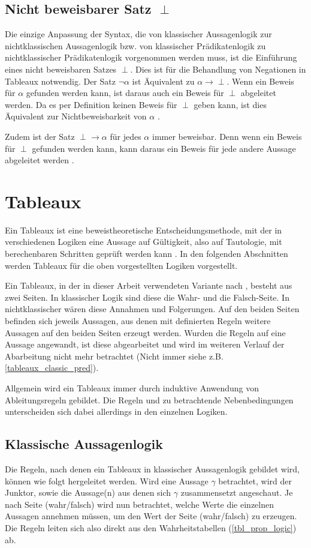 \subsection{\label{intu_non_proof_sentence}Nicht beweisbarer Satz $\perp$}
Die einzige Anpassung der Syntax, die von klassischer Aussagenlogik zur nichtklassischen Aussagenlogik bzw. von klassischer Prädikatenlogik zu nichtklassischer Prädikatenlogik vorgenommen werden muss, ist die Einführung eines nicht beweisbaren Satzes $\perp$. Dies ist für die Behandlung von Negationen in Tableaux notwendig. Der Satz $\neg\alpha$ ist Äquivalent zu $\alpha\rightarrow\perp$. Wenn ein Beweis für $\alpha$ gefunden werden kann, ist daraus auch ein Beweis für $\perp$ abgeleitet werden. Da es per Definition keinen Beweis für $\perp$ geben kann, ist dies Äquivalent zur Nichtbeweisbarkeit von $\alpha$ \cite{DGHP99}.

Zudem ist der Satz $\perp\rightarrow\alpha$ für jedes $\alpha$ immer beweisbar. Denn wenn ein Beweis für $\perp$ gefunden werden kann, kann daraus ein Beweis für jede andere Aussage abgeleitet werden \cite{DGHP99}.

\section{Tableaux}
Ein Tableaux ist eine beweistheoretische Entscheidungsmethode, mit der in verschiedenen Logiken eine Aussage auf Gültigkeit, also auf Tautologie, mit berechenbaren Schritten geprüft werden kann \cite{DGHP99}. In den folgenden Abschnitten werden Tableaux für die oben vorgestellten Logiken vorgestellt.

Ein Tableaux, in der in dieser Arbeit verwendeten Variante nach \cite{BK82}, besteht aus zwei Seiten. In klassischer Logik sind diese die Wahr- und die Falsch-Seite. In nichtklassischer wären diese Annahmen und Folgerungen. Auf den beiden Seiten befinden sich jeweils Aussagen, aus denen mit definierten Regeln weitere Aussagen auf den beiden Seiten erzeugt werden. Wurden die Regeln auf eine Aussage angewandt, ist diese abgearbeitet und wird im weiteren Verlauf der Abarbeitung nicht mehr betrachtet (Nicht immer siehe z.B. \ref{tableaux_classic_pred}).

Allgemein wird ein Tableaux immer durch induktive Anwendung von Ableitungsregeln gebildet. Die Regeln und zu betrachtende Nebenbedingungen unterscheiden sich dabei allerdings in den einzelnen Logiken.

\subsection{Klassische Aussagenlogik}
Die Regeln, nach denen ein Tableaux in klassischer Aussagenlogik gebildet wird, können wie folgt hergeleitet werden. Wird eine Aussage $\gamma$ betrachtet, wird der Junktor, sowie die Aussage(n) aus denen sich $\gamma$ zusammensetzt angeschaut. Je nach Seite (wahr/falsch) wird nun betrachtet, welche Werte die einzelnen Aussagen annehmen müssen, um den Wert der Seite (wahr/falsch) zu erzeugen. Die Regeln leiten sich also direkt aus den Wahrheitstabellen (\ref{tbl_prop_logic}) ab.

